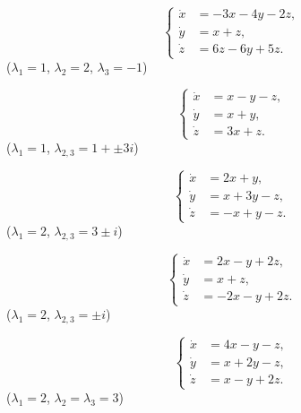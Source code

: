 \begin{multicols}{2}
    \begin{problem}
        \[ \left\{ \begin{aligned} 
            \dot x &= -3 x - 4 y - 2 z, \\
            \dot y &= x + z, \\
            \dot z &= 6 z - 6 y + 5 z.
        \end{aligned} \right. \]
        ($\lambda_1 = 1$, $\lambda_2 = 2$, $\lambda_3 = -1$)
    \end{problem}
    
    \begin{problem} 
        \[ \left\{ \begin{aligned} 
            \dot x &= x - y - z, \\
            \dot y &= x + y, \\
            \dot z &= 3 x + z.
        \end{aligned} \right. \]
        ($\lambda_1 = 1$, $\lambda_{2, 3} = 1 +\pm 3 i$)
    \end{problem}
    
    \begin{problem}
        \[ \left\{ \begin{aligned} 
            \dot x &= 2 x + y, \\
            \dot y &= x + 3 y - z, \\
            \dot z &= -x + y - z.
        \end{aligned} \right. \]
        ($\lambda_1 = 2$, $\lambda_{2, 3} = 3 \pm i$)
    \end{problem}
    
    \begin{problem}
        \[ \left\{ \begin{aligned} 
            \dot x &= 2 x - y + 2 z, \\
            \dot y &= x + z, \\
            \dot z &= -2 x - y + 2 z.
        \end{aligned} \right. \]
        ($\lambda_1 = 2$, $\lambda_{2, 3} = \pm i$)
    \end{problem}
    
    \begin{problem}
        \[ \left\{ \begin{aligned} 
            \dot x &= 4 x - y - z, \\
            \dot y &= x + 2 y - z, \\
            \dot z &= x - y + 2 z.
        \end{aligned} \right. \]
        ($\lambda_1 = 2$, $\lambda_2 = \lambda_3 = 3$)
    \end{problem}
    

\end{multicols}
